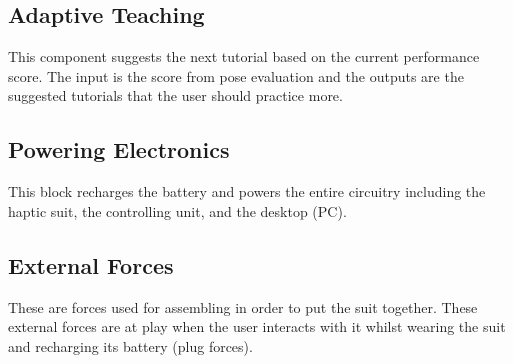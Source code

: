 \subsection{Adaptive Teaching}
This component suggests the next tutorial based on the current performance score. The input is the score from pose evaluation and the outputs are the suggested tutorials that the user should practice more. 

\subsection{Powering Electronics}
This block recharges the battery and powers the entire circuitry including the haptic suit, the controlling unit, and the desktop (PC). 

\subsection{External Forces}
These are forces used for assembling in order to put the suit together. These external forces are at play when the user interacts with it whilst wearing the suit and recharging its battery (plug forces).





